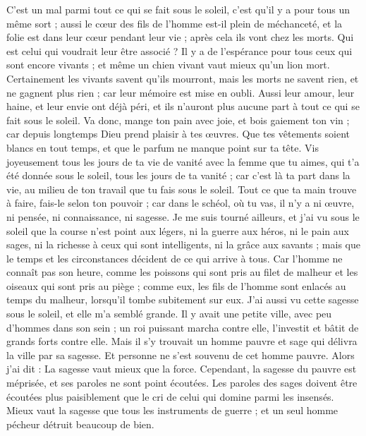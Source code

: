 \begin{multicols}{2}
C'est un mal parmi tout ce qui se fait sous le soleil, c'est qu'il y a pour tous un même sort ; aussi le cœur des fils de l'homme est-il plein de méchanceté, et la folie est dans leur cœur pendant leur vie ; après cela ils vont chez les morts. Qui est celui qui voudrait leur être associé ?
Il y a de l'espérance pour tous ceux qui sont encore vivants ; et même un chien vivant vaut mieux qu'un lion mort.
Certainement les vivants savent qu'ils mourront, mais les morts ne savent rien, et ne gagnent plus rien ; car leur mémoire est mise en oubli. 
Aussi leur amour, leur haine, et leur envie ont déjà péri, et ils n'auront plus aucune part à tout ce qui se fait sous le soleil.
Va donc, mange ton pain avec joie, et bois gaiement ton vin ; car depuis longtemps Dieu prend plaisir à tes œuvres.
Que tes vêtements soient blancs en tout temps, et que le parfum ne manque point sur ta tête. 
Vis joyeusement tous les jours de ta vie de vanité avec la femme que tu aimes, qui t'a été donnée sous le soleil, tous les jours de ta vanité ; car c'est là ta part dans la vie, au milieu de ton travail que tu fais sous le soleil.
Tout ce que ta main trouve à faire, fais-le selon ton pouvoir ; car dans le schéol, où tu vas, il n'y a ni œuvre, ni pensée, ni connaissance, ni sagesse.
Je me suis tourné ailleurs, et j'ai vu sous le soleil que la course n'est point aux légers, ni la guerre aux héros, ni le pain aux sages, ni la richesse à ceux qui sont intelligents, ni la grâce aux savants ; mais que le temps et les circonstances décident de ce qui arrive à tous.
Car l'homme ne connaît pas son heure, comme les poissons qui sont pris au filet de malheur et les oiseaux qui sont pris au piège ; comme eux, les fils de l'homme sont enlacés au temps du malheur, lorsqu'il tombe subitement sur eux.
J'ai aussi vu cette sagesse sous le soleil, et elle m'a semblé grande.
Il y avait une petite ville, avec peu d'hommes dans son sein ; un roi puissant marcha contre elle, l'investit et bâtit de grands forts contre elle.
Mais il s'y trouvait un homme pauvre et sage qui délivra la ville par sa sagesse. Et personne ne s'est souvenu de cet homme pauvre.
Alors j'ai dit : La sagesse vaut mieux que la force. Cependant, la sagesse du pauvre est méprisée, et ses paroles ne sont point écoutées.
Les paroles des sages doivent être écoutées plus paisiblement que le cri de celui qui domine parmi les insensés. 
Mieux vaut la sagesse que tous les instruments de guerre ; et un seul homme pécheur détruit beaucoup de bien.

\end{multicols}
